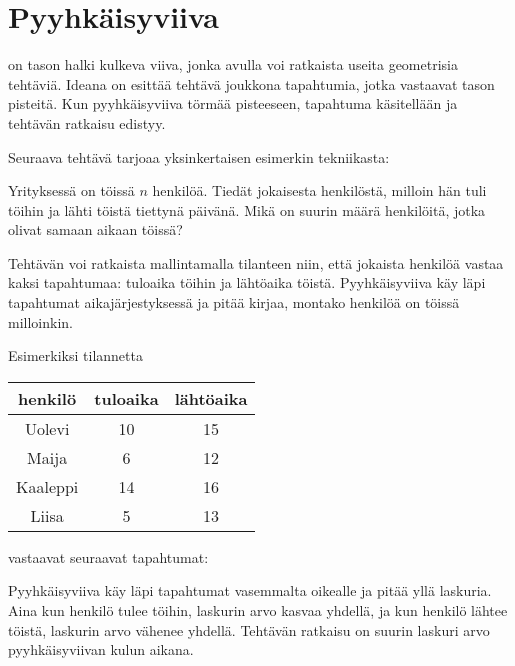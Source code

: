 \chapter{Pyyhkäisyviiva}


 on tason halki kulkeva viiva,
jonka avulla voi ratkaista useita geometrisia tehtäviä.
Ideana on esittää tehtävä joukkona tapahtumia,
jotka vastaavat tason pisteitä.
Kun pyyhkäisyviiva törmää pisteeseen,
tapahtuma käsitellään ja tehtävän ratkaisu edistyy.

Seuraava tehtävä tarjoaa yksinkertaisen
esimerkin tekniikasta:
\begin{task}
Yrityksessä on töissä $n$ henkilöä.
Tiedät jokaisesta henkilöstä,
milloin hän tuli töihin ja lähti töistä
tiettynä päivänä.
Mikä on suurin määrä henkilöitä,
jotka olivat samaan aikaan töissä?
\end{task}
Tehtävän voi ratkaista mallintamalla tilanteen
niin, että jokaista henkilöä vastaa kaksi tapahtumaa:
tuloaika töihin ja lähtöaika töistä.
Pyyhkäisyviiva käy läpi tapahtumat aikajärjestyksessä
ja pitää kirjaa, montako henkilöä on töissä milloinkin.

Esimerkiksi tilannetta
\begin{center}
\begin{tabular}{ccc}
henkilö & tuloaika & lähtöaika \\
\hline
Uolevi & 10 & 15 \\
Maija & 6 & 12 \\
Kaaleppi & 14 & 16 \\
Liisa & 5 & 13 \\
\end{tabular}
\end{center}
vastaavat seuraavat tapahtumat:
\begin{center}
\end{center}
Pyyhkäisyviiva käy läpi tapahtumat vasemmalta oikealle
ja pitää yllä laskuria.
Aina kun henkilö tulee töihin, laskurin arvo
kasvaa yhdellä, ja kun henkilö lähtee töistä,
laskurin arvo vähenee yhdellä.
Tehtävän ratkaisu on suurin laskuri arvo
pyyhkäisyviivan kulun aikana.


